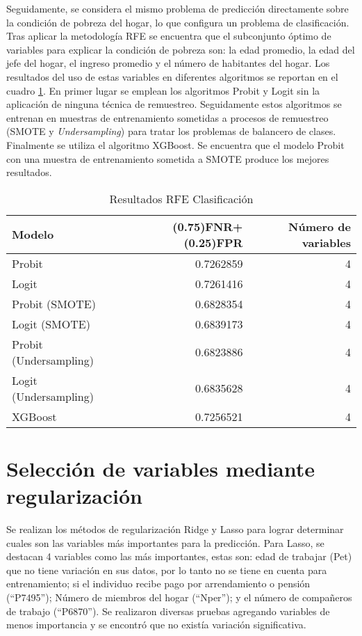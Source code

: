 \documentclass[11pt,a4paper]{article}
\begin{document}
Seguidamente, se considera el mismo problema de predicción directamente sobre la condición de pobreza del hogar, lo que configura un problema de clasificación. Tras aplicar la metodología RFE se encuentra que el subconjunto óptimo de variables para explicar la condición de pobreza son: la edad promedio, la edad del jefe del hogar, el ingreso promedio y el número de habitantes del hogar. Los resultados del uso de estas variables en diferentes algoritmos se reportan en el cuadro \ref{tab:rfe_clas}. En primer lugar se emplean los algoritmos Probit y Logit sin la aplicación de ninguna técnica de remuestreo. Seguidamente estos algoritmos se entrenan en muestras de entrenamiento sometidas a procesos de remuestreo (SMOTE y \emph{Undersampling}) para tratar los problemas de balancero de clases. Finalmente se utiliza el algoritmo XGBoost. Se encuentra que el modelo Probit con una muestra de entrenamiento sometida a SMOTE produce los mejores resultados.

\begin{table}[H]
\caption{Resultados RFE Clasificación}
\centering
\begin{tabular}{lrr}
\toprule
Modelo & (0.75)FNR+(0.25)FPR & Número de variables\\
\midrule
Probit & 0.7262859 & 4\\
Logit & 0.7261416 & 4\\
Probit (SMOTE) & 0.6828354 & 4\\
Logit (SMOTE) & 0.6839173 & 4\\
Probit (Undersampling) & 0.6823886 & 4\\
Logit (Undersampling) & 0.6835628 & 4\\
XGBoost & 0.7256521 & 4\\
\bottomrule
\end{tabular}
\label{tab:rfe_clas}
\end{table}


\section{Selección de variables mediante regularización}

Se realizan los métodos de regularización Ridge y Lasso para lograr determinar cuales son las variables más importantes para la predicción. Para Lasso, se destacan 4 variables como las más importantes, estas son: edad de trabajar (Pet) que no tiene variación en sus datos, por lo tanto no se tiene en cuenta para entrenamiento; si el individuo recibe pago por arrendamiento o pensión (``P7495''); Número de miembros del hogar (``Nper''); y el número de compañeros de trabajo (``P6870''). Se realizaron diversas pruebas agregando variables de menos importancia y se encontró que no existía variación significativa.
\end{document}
